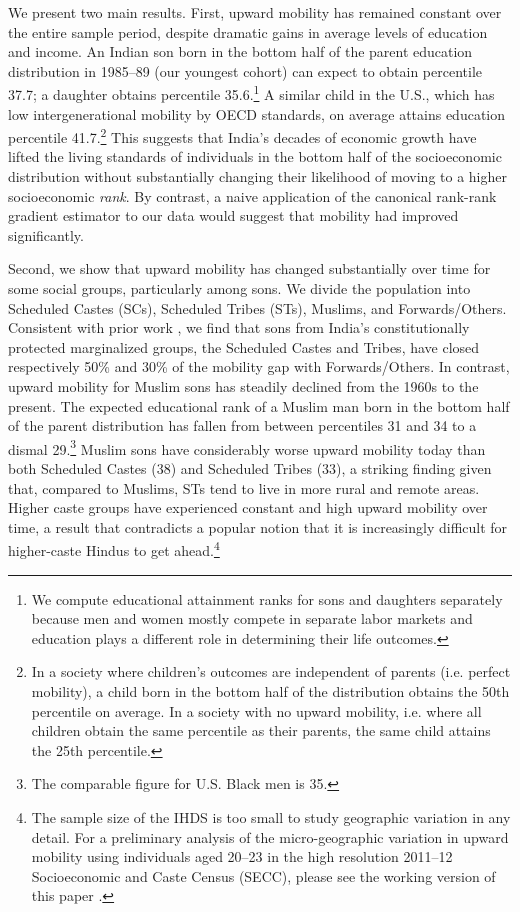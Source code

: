 \documentclass[12pt,letterpaper]{article}
\numberwithin{equation}{section}
\begin{document}
We present two main results. First, upward mobility has remained constant over the entire sample period, despite dramatic gains in average levels of education and income. An Indian son born in the bottom half of the parent education distribution in 1985--89 (our youngest cohort) can expect to obtain percentile 37.7; a daughter obtains percentile 35.6.\footnote{We compute educational attainment ranks for sons and daughters separately because men and women mostly compete in separate labor markets and education plays a different role in determining their life outcomes.} A similar child in the U.S., which has low intergenerational mobility by OECD standards, on average attains education percentile 41.7.\footnote{In a society where children's outcomes are independent of parents (i.e. perfect mobility), a child born in the bottom half of the distribution obtains the 50th percentile on average. In a society with no upward mobility, i.e. where all children obtain the same percentile as their parents, the same child attains the 25th percentile.} This suggests that India's decades of economic growth have lifted the living standards of individuals in the bottom half of the socioeconomic distribution without substantially changing their likelihood of moving to a higher socioeconomic \textit{rank}. By contrast, a naive application of the canonical rank-rank gradient estimator to our data would suggest that mobility had improved significantly.

Second, we show that upward mobility has changed substantially over time for some social groups, particularly among sons. We divide the population into Scheduled Castes (SCs), Scheduled Tribes (STs), Muslims, and Forwards/Others. Consistent with prior work \cite{hnatkovska2012,emran2015}, we find that sons from India's constitutionally protected marginalized groups, the Scheduled Castes and Tribes, have closed respectively 50\% and 30\% of the mobility gap with Forwards/Others. In contrast, upward mobility for Muslim sons has steadily declined from the 1960s to the present. The expected educational rank of a Muslim man born in the bottom half of the parent distribution has fallen from between percentiles 31 and 34 to a dismal 29.\footnote{The comparable figure for U.S. Black men is 35.} Muslim sons have considerably worse upward mobility today than both Scheduled Castes (38) and Scheduled Tribes (33), a striking finding given that, compared to Muslims, STs tend to live in more rural and remote areas. Higher caste groups have experienced constant and high upward mobility over time, a result that contradicts a popular notion that it is increasingly difficult for higher-caste Hindus to get ahead.\footnote{The sample size of the IHDS is too small to study geographic variation in any detail. For a preliminary analysis of the micro-geographic variation in upward mobility using individuals aged 20--23 in the high resolution 2011--12 Socioeconomic and Caste Census (SECC), please see the working version of this paper \cite{anr2019mob}.}
\end{document}
